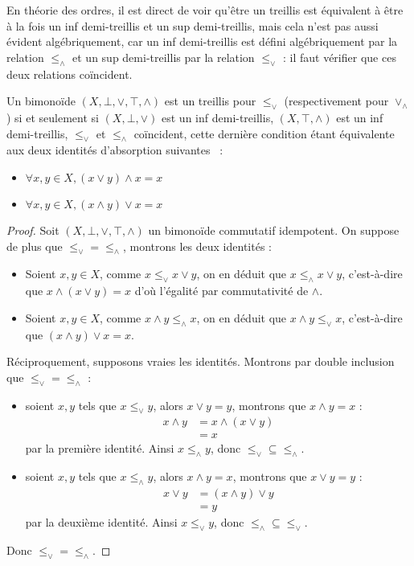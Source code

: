 En théorie des ordres, il est direct de voir qu'être un treillis est équivalent
à être à la fois un inf demi-treillis et un sup demi-treillis, mais cela n'est
pas aussi évident algébriquement, car un inf demi-treillis est défini
algébriquement par la relation $\leq_\land$ et un sup demi-treillis par la
relation $\leq_\lor$ : il faut vérifier que ces deux relations coïncident.

\begin{proposition}
  Un bimonoïde $(X,\bot,\lor,\top,\land)$ est un treillis pour $\leq_\lor$
  (respectivement pour $\lor_\land$) si et seulement si $(X,\bot,\lor)$ est un
  inf demi-treillis, $(X,\top,\land)$ est un inf demi-treillis, $\leq_\lor$ et
  $\leq_\land$ coïncident, cette dernière condition étant équivalente aux
  deux identités d'absorption suivantes~ :
  \begin{itemize}
  \item $\forall x,y\in X, (x\lor y)\land x = x$
  \item $\forall x,y\in X, (x\land y)\lor x = x$
  \end{itemize}
\end{proposition}

\begin{proof}
  Soit $(X,\bot,\lor,\top,\land)$ un bimonoïde commutatif idempotent. On
  suppose de plus que $\leq_\lor = \leq_\land$, montrons les deux identités :
  \begin{itemize}
  \item Soient $x,y\in X$, comme $x\leq_\lor x\lor y$, on en déduit que
    $x\leq_\land x\lor y$, c'est-à-dire que $x\land (x\lor y) = x$ d'où
    l'égalité par commutativité de $\land$.
  \item Soient $x,y\in X$, comme $x\land y\leq_\land x$, on en déduit que
    $x\land y \leq_\lor x$, c'est-à-dire que $(x\land y)\lor x = x$.
  \end{itemize}

  Réciproquement, supposons vraies les identités. Montrons par double inclusion
  que $\leq_\lor = \leq_\land$ :
  \begin{itemize}
  \item soient $x,y$ tels que $x\leq_\lor y$, alors $x\lor y = y$, montrons que
    $x\land y = x$ :
    \begin{align*}
      x \land y &= x \land (x \lor y)\\
      &= x
    \end{align*}
    par la première identité. Ainsi $x\leq_\land y$, donc
    $\leq_\lor\subseteq\leq_\land$.
  \item soient $x,y$ tels que $x\leq_\land y$, alors $x\land y = x$, montrons que
    $x\lor y = y$ :
    \begin{align*}
      x \lor y &= (x\land y) \lor y\\
      &= y
    \end{align*}
    par la deuxième identité. Ainsi $x\leq_\lor y$, donc
    $\leq_\land\subseteq\leq_\lor$.
  \end{itemize}
  Donc $\leq_\lor = \leq_\land$.
\end{proof}

